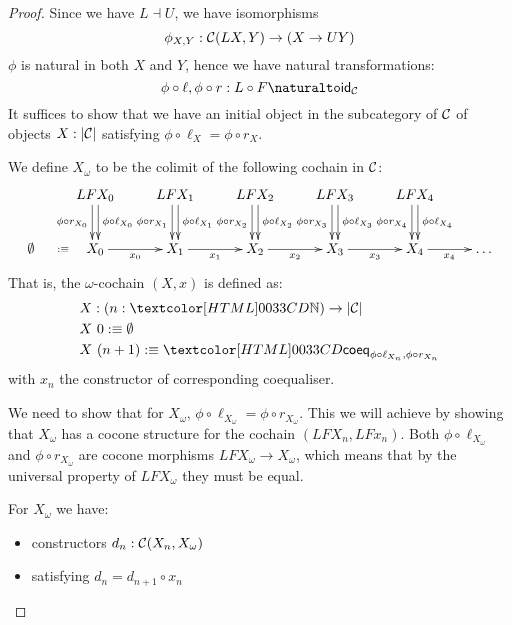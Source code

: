 \begin{proof}
  Since we have $L \dashv U$, we have isomorphisms
  $$
  \phi_{X,Y} : \mathcal{C}(L X , Y) \to (X \to U Y)
  $$
  $\phi$ is natural in both $X$ and $Y$, hence we have natural
  transformations:
  $$
  \phi \circ \ell , \phi \circ r : \Nat{L \circ F}{\id_{\Cc}}
  $$
  It suffices to show that we have an initial object in the
  subcategory of $\mathcal{C}$ of objects $X : | \mathcal{C} |$ satisfying
  $\phi \circ \ell_X = \phi \circ r_X$.

  We define $X_\omega$ to be the colimit of the following cochain in $\mathcal{C}$:
  $$
  \xymatrix{
    &LF X_0
    \ar@<.5ex>[d]^{\phi \circ \ell_{X_0}}
    \ar@<-.5ex>[d]_{\phi \circ r_{X_0}}
    &LF X_1
    \ar@<.5ex>[d]^{\phi \circ \ell_{X_1}}
    \ar@<-.5ex>[d]_{\phi \circ r_{X_1}}
    &LF X_2 
    \ar@<.5ex>[d]^{\phi \circ \ell_{X_2}}
    \ar@<-.5ex>[d]_{\phi \circ r_{X_2}}
    &LF X_3
    \ar@<.5ex>[d]^{\phi \circ \ell_{X_3}}
    \ar@<-.5ex>[d]_{\phi \circ r_{X_3}}
    &LF X_4
    \ar@<.5ex>[d]^{\phi \circ \ell_{X_4}}
    \ar@<-.5ex>[d]_{\phi \circ r_{X_4}}
    \\
    \initobj \ar@{}[r]|{\ddefeq} 
    &X_0
    \ar[r]_{x_0}
    &X_1
    \ar[r]_{x_1}
    &X_2 
    \ar[r]_{x_2}
    &X_3
    \ar[r]_{x_3}
    &X_4
    \ar[r]_{x_4}
    &\hdots
    }
  $$
  That is, the $\omega$-cochain $(X,x)$ is defined as:
  \begin{align*}
    &X : (n : \natty) \to | \Cc | \\
    &X\ 0 \ddefeq \initobj \\
    &X\ (n+1) \ddefeq \coeqty{\phi \circ \ell_{X_n}}{\phi \circ r_{X_n}}
  \end{align*}
  with $x_{n}$ the constructor of corresponding coequaliser.

  We need to show that for $X_\omega$,
  $\phi \circ \ell_{X_\omega} = \phi \circ r_{X_\omega}$. This we will
  achieve by showing that $X_\omega$ has a cocone structure for the
  cochain $(LFX_n, LFx_n)$. Both $\phi \circ \ell_{X_\omega}$ and
  $\phi \circ r_{X_\omega}$ are cocone morphisms
  $LF X_\omega \to X_\omega$, which means that by the universal
  property of $LF X_\omega$ they must be equal.

  For $X_\omega$ we have:
  \begin{itemize}
  \item constructors $d_n : \mathcal{C}(X_n, X_\omega)$
  \item satisfying $d_n = d_{n+1} \circ x_n$
  \end{itemize}


\end{proof}
